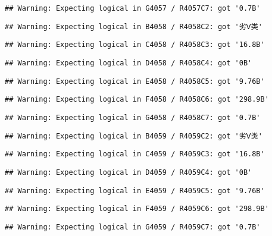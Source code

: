 \documentclass[
]{article}
\begin{document}
\begin{verbatim}
## Warning: Expecting logical in G4057 / R4057C7: got '0.7B'
\end{verbatim}

\begin{verbatim}
## Warning: Expecting logical in B4058 / R4058C2: got '劣Ⅴ类'
\end{verbatim}

\begin{verbatim}
## Warning: Expecting logical in C4058 / R4058C3: got '16.8B'
\end{verbatim}

\begin{verbatim}
## Warning: Expecting logical in D4058 / R4058C4: got '0B'
\end{verbatim}

\begin{verbatim}
## Warning: Expecting logical in E4058 / R4058C5: got '9.76B'
\end{verbatim}

\begin{verbatim}
## Warning: Expecting logical in F4058 / R4058C6: got '298.9B'
\end{verbatim}

\begin{verbatim}
## Warning: Expecting logical in G4058 / R4058C7: got '0.7B'
\end{verbatim}

\begin{verbatim}
## Warning: Expecting logical in B4059 / R4059C2: got '劣Ⅴ类'
\end{verbatim}

\begin{verbatim}
## Warning: Expecting logical in C4059 / R4059C3: got '16.8B'
\end{verbatim}

\begin{verbatim}
## Warning: Expecting logical in D4059 / R4059C4: got '0B'
\end{verbatim}

\begin{verbatim}
## Warning: Expecting logical in E4059 / R4059C5: got '9.76B'
\end{verbatim}

\begin{verbatim}
## Warning: Expecting logical in F4059 / R4059C6: got '298.9B'
\end{verbatim}

\begin{verbatim}
## Warning: Expecting logical in G4059 / R4059C7: got '0.7B'
\end{verbatim}
\end{document}
